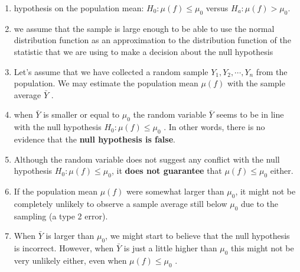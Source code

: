 \begin{enumerate}
    \item hypothesis on the population mean: $H_0 : \mu( f ) \leq \mu_0$ versus $H_a : \mu( f ) > \mu_0 $.
    \hfill \cite{statistics/book/Statistics-for-Data-Scientists/Maurits-Kaptein}

    \item we assume that the sample is large enough to be able to use the normal distribution function as an approximation to the distribution function of the statistic that we are using to make a decision about the null hypothesis
    \hfill \cite{statistics/book/Statistics-for-Data-Scientists/Maurits-Kaptein}

    \item Let’s assume that we have collected a random sample $Y_1 , Y_2, \cdots , Y_n$ from the population.
    We may estimate the population mean $\mu ( f )$ with the sample average $\bar{Y}$ .
    \hfill \cite{statistics/book/Statistics-for-Data-Scientists/Maurits-Kaptein}

    \item when $\bar{Y}$ is smaller or equal to $\mu_0$ the random variable $\bar{Y}$ seems to be in line with the null hypothesis $H_0 : \mu( f ) \leq \mu_0$ .
    In other words, there is no evidence that the \textbf{null hypothesis is false}.
    \hfill \cite{statistics/book/Statistics-for-Data-Scientists/Maurits-Kaptein}

    \item Although the random variable does not suggest any conflict with the null hypothesis $H_0 : \mu( f ) \leq \mu_0 $, it \textbf{does not guarantee} that $\mu( f ) \leq \mu_0$ either.
    \hfill \cite{statistics/book/Statistics-for-Data-Scientists/Maurits-Kaptein}

    \item If the population mean $\mu( f )$ were somewhat larger than $\mu_0 $, it might not be completely unlikely to observe a sample average still below $\mu_0$ due to the sampling (a type 2 error).
    \hfill \cite{statistics/book/Statistics-for-Data-Scientists/Maurits-Kaptein}

    \item When $\bar{Y}$ is larger than $\mu_0 $, we might start to believe that the null hypothesis is incorrect.
    However, when $\bar{Y}$ is just a little higher than $\mu_0$ this might not be very unlikely either, even when $\mu( f ) \leq \mu_0$ .
    \hfill \cite{statistics/book/Statistics-for-Data-Scientists/Maurits-Kaptein}


\end{enumerate}
